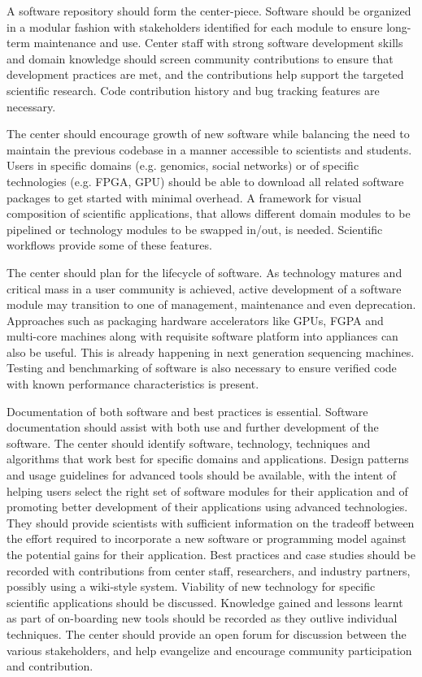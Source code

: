 A software repository should form the center-piece. Software should be organized in a modular fashion with stakeholders identified for each module to ensure long-term maintenance and use. Center staff with strong software development skills and domain knowledge should screen community contributions to ensure that development practices are met, and the contributions help support the targeted scientific research. Code contribution history and bug tracking features are necessary.

The center should encourage growth of new software while balancing the need to maintain the previous codebase in a manner accessible to scientists and students. Users in specific domains (e.g. genomics, social networks) or of specific technologies (e.g. FPGA, GPU) should be able to download all related software packages to get started with minimal overhead. A framework for visual composition of scientific applications, that allows different domain modules to be pipelined or technology modules to be swapped in/out, is needed. Scientific workflows provide some of these features.

The center should plan for the lifecycle of software. As technology matures and critical mass in a user community is achieved, active development of a software module may transition to one of management, maintenance and even deprecation. Approaches such as packaging hardware accelerators like GPUs, FGPA and multi-core machines along with requisite software platform into appliances can also be useful. This is already happening in next generation sequencing machines. Testing and benchmarking of software is also necessary to ensure verified code with known performance characteristics is present.

Documentation of both software and best practices is essential. Software documentation should assist with both use and further development of the software. The center should identify software,
technology, techniques and algorithms that work best for specific domains and applications. Design patterns and usage guidelines for advanced tools should be available, with the intent of helping users select the right set of software modules for their application and of promoting better development of their applications using advanced technologies. They should provide scientists with sufficient information on the tradeoff between the effort required to incorporate a new software or programming model against the potential gains for their application. Best practices and case studies should be recorded with contributions from center staff, researchers, and industry partners, possibly using a wiki-style system. Viability of new technology for specific scientific applications should be discussed. Knowledge gained and lessons learnt as part of on-boarding new tools should be recorded as they outlive individual techniques. The center should provide an open forum for discussion between the various stakeholders, and help evangelize and encourage community participation and contribution.

